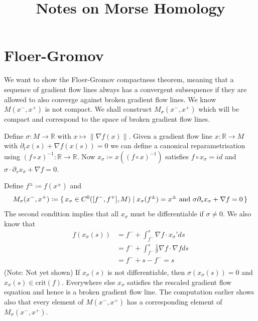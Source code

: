 \documentclass{article}
\title{Notes on Morse Homology}
\begin{document}
	\maketitle
	
	\section{Floer-Gromov}
	We want to show the Floer-Gromov compactness theorem, meaning that a sequence
	of gradient flow lines always has a convergent subsequence if they are allowed
	to also converge against broken gradient flow lines.
	We know $M(x^-,x^+)$ is not compact. We shall construct $M_\sigma(x^-,x^+)$
	which will be compact and correspond to the space of broken gradient flow lines.
	
	Define $\sigma: M \to \mathbb{R}$ with $x \mapsto \lVert \nabla f(x) \rVert $.
	Given a gradient flow line $x: \mathbb{R} \to M$ with $\partial_t x(s) + \nabla f (x(s)) = 0$
	we can define a canonical reparametrisation using $(f \circ x)^{-1}: \mathbb{R} \to \mathbb{R}$.
	Now $x_\sigma \coloneq x((f \circ x)^{-1})$ satisfies $f \circ x_\sigma = id$ and
	$\sigma \cdot \partial_s x_\sigma + \nabla f = 0$.
	
	Define $f^{\pm} \coloneq f(x^{\pm})$ and
	\begin{align*}
		M_\sigma(x^-,x^+) \coloneq \set{ x_\sigma \in C^0([f^-,f^+],M) \mid x_\sigma(f^\pm) = x^\pm \text{ and } \sigma \partial_s x_\sigma + \nabla f = 0}
	\end{align*}
	The second condition implies that all $x_\sigma$ must be differentiable if $\sigma \neq 0$.
	We also know that
	\begin{align*}
		f(x_\sigma(s)) 	&= f^- + \int_{f^-}^{s} \nabla f \cdot x_\sigma' ds \\
				&= f^- + \int_{f^-}^{s} \frac 1 \sigma \nabla f \cdot \nabla f ds \\
				&= f^- + s - f^- = s \\
	\end{align*}
	(Note: Not yet shown)
	If $x_\sigma(s)$ is not differentiable, then $\sigma(x_\sigma(s)) = 0$ and
	$x_\sigma(s) \in \text{crit}(f)$. Everywhere else $x_\sigma$ satisfies
	the rescaled gradient flow equation and hence is a broken gradient flow line.
	The computation earlier shows also that every element of $M(x^-,x^+)$
	has a corresponding element of $M_\sigma(x^-,x^+)$.
\end{document}
